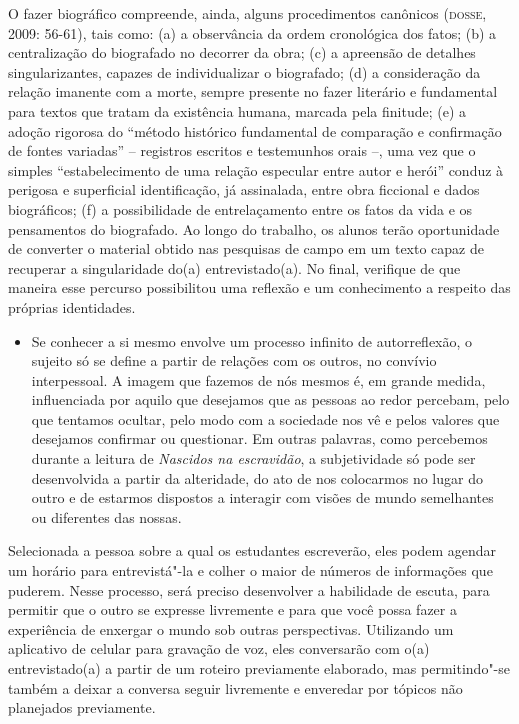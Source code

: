 \documentclass[11pt]{extarticle}
\begin{document}
O fazer biográfico compreende, ainda, alguns procedimentos canônicos
(\textsc{dosse}, 2009: 56-61), tais como: (a) a observância da ordem cronológica
dos fatos; (b) a centralização do biografado no decorrer da obra; (c) a
apreensão de detalhes singularizantes, capazes de individualizar o
biografado; (d) a consideração da relação imanente com a morte, sempre
presente no fazer literário e fundamental para textos que tratam da
existência humana, marcada pela finitude; (e) a adoção rigorosa do
``método histórico fundamental de comparação e confirmação de fontes
variadas'' -- registros escritos e testemunhos orais --, uma vez que o
simples ``estabelecimento de uma relação especular entre autor e herói''
conduz à perigosa e superficial identificação, já assinalada, entre obra
ficcional e dados biográficos; (f) a possibilidade de entrelaçamento
entre os fatos da vida e os pensamentos do biografado. Ao longo do
trabalho, os alunos terão oportunidade de converter o material obtido
nas pesquisas de campo em um texto capaz de recuperar a singularidade
do(a) entrevistado(a). No final, verifique de que maneira esse percurso
possibilitou uma reflexão e um conhecimento a respeito das próprias
identidades.

\begin{itemize}
\item
  Se conhecer a si mesmo envolve um processo infinito de autorreflexão,
  o sujeito só se define a partir de relações com os outros, no convívio
  interpessoal. A imagem que fazemos de nós mesmos é, em grande medida,
  influenciada por aquilo que desejamos que as pessoas ao redor
  percebam, pelo que tentamos ocultar, pelo modo com a sociedade nos vê
  e pelos valores que desejamos confirmar ou questionar. Em outras
  palavras, como percebemos durante a leitura de \emph{Nascidos na
  escravidão}, a subjetividade só pode ser desenvolvida a partir da
  alteridade, do ato de nos colocarmos no lugar do outro e de estarmos
  dispostos a interagir com visões de mundo semelhantes ou diferentes
  das nossas.
\end{itemize}

Selecionada a pessoa sobre a qual os estudantes escreverão, eles podem
agendar um horário para entrevistá"-la e colher o maior de números de
informações que puderem. Nesse processo, será preciso desenvolver a
habilidade de escuta, para permitir que o outro se expresse livremente e
para que você possa fazer a experiência de enxergar o mundo sob outras
perspectivas. Utilizando um aplicativo de celular para gravação de voz,
eles conversarão com o(a) entrevistado(a) a partir de um roteiro
previamente elaborado, mas permitindo"-se também a deixar a conversa
seguir livremente e enveredar por tópicos não planejados previamente.
\end{document}
